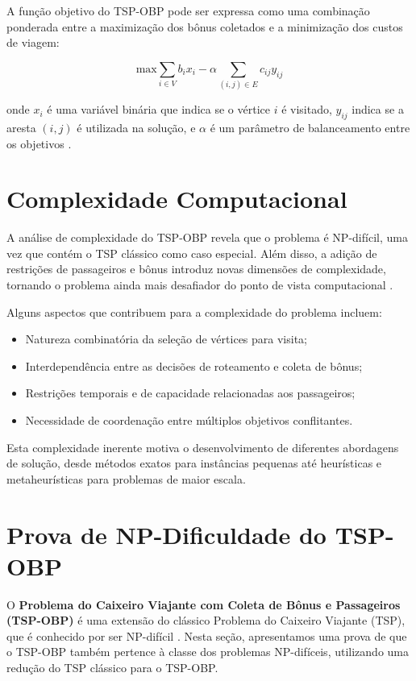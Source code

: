 \documentclass[12pt, a4paper]{report}
\begin{document}
A função objetivo do TSP-OBP pode ser expressa como uma combinação ponderada entre a maximização dos bônus coletados e a minimização dos custos de viagem:

\begin{equation}
    \text{max} \sum_{i \in V} b_i x_i - \alpha \sum_{(i,j) \in E} c_{ij} y_{ij}
\end{equation}

onde $x_i$ é uma variável binária que indica se o vértice $i$ é visitado, $y_{ij}$ indica se a aresta $(i,j)$ é utilizada na solução, e $\alpha$ é um parâmetro de balanceamento entre os objetivos \cite{lopesfilho2019}.

\section{Complexidade Computacional}
A análise de complexidade do TSP-OBP revela que o problema é NP-difícil, uma vez que contém o TSP clássico como caso especial. Além disso, a adição de restrições de passageiros e bônus introduz novas dimensões de complexidade, tornando o problema ainda mais desafiador do ponto de vista computacional \cite{carvalho2022}.

Alguns aspectos que contribuem para a complexidade do problema incluem:

\begin{itemize}
    \item Natureza combinatória da seleção de vértices para visita;
    \item Interdependência entre as decisões de roteamento e coleta de bônus;
    \item Restrições temporais e de capacidade relacionadas aos passageiros;
    \item Necessidade de coordenação entre múltiplos objetivos conflitantes.
\end{itemize}

Esta complexidade inerente motiva o desenvolvimento de diferentes abordagens de solução, desde métodos exatos para instâncias pequenas até heurísticas e metaheurísticas para problemas de maior escala.

\section{Prova de NP-Dificuldade do TSP-OBP}

O \textbf{Problema do Caixeiro Viajante com Coleta de Bônus e Passageiros (TSP-OBP)} é uma extensão do clássico Problema do Caixeiro Viajante (TSP), que é conhecido por ser NP-difícil \cite{goldbarg2012}. Nesta seção, apresentamos uma prova de que o TSP-OBP também pertence à classe dos problemas NP-difíceis, utilizando uma redução do TSP clássico para o TSP-OBP.
\end{document}
